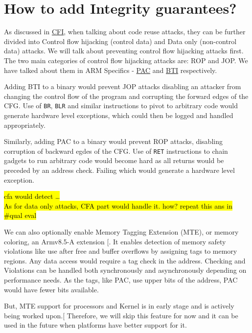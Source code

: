 \documentclass[a4paper, nobind]{templates/ociamthesis}
\begin{document}
\section{How to add Integrity guarantees?}\label{how-to-add-integrity-guarantees}

As discussed in \hyperref[cfi]{CFI}, when talking about code reuse attacks, they can be further divided into
Control flow hijacking (control data) and Data only (non-control data) attacks.
We will talk about preventing control flow hijacking attacks first.
The two main categories of control flow hijacking attacks are: ROP and JOP.
We have talked about them in ARM Specifics - \hyperref[pac-bg]{PAC} and \hyperref[bti-bg]{BTI} respectively.

Adding BTI to a binary would prevent JOP attacks disabling an attacker from changing
the control flow of the program and corrupting the forward edges of the CFG.
Use of \texttt{BR}, \texttt{BLR} and similar instructions to pivot to arbitrary code would generate hardware
level exceptions, which could then be logged and handled appropriately.

Similarly, adding PAC to a binary would prevent ROP attacks, disabling corruption
of backward egdes of the CFG.
Use of \texttt{RET} instructions to chain gadgets to run arbitrary code would become hard
as all returns would be preceded by an address check. Failing which would generate
a hardware level exception.

\hl{cfa would detect \ldots{}\\
As for data only attacks, CFA part would handle it. how? repeat this ans in \#qual eval}

We can also optionally enable Memory Tagging Extension (MTE), or memory coloring,
an Armv8.5-A extension {[}\citeproc{ref-arm-pacbti}{5}{]}. It enables detection of memory safety violations like use after free
and buffer overflows by assigning tags to memory regions. Any data access would
require a tag check in the address. Checking and Violations can be handled both
synchronously and asynchronously depending on performance needs.
As the tags, like PAC, use upper bits of the address, PAC would have fewer bits available.

But, MTE support for processors and Kernel is in early stage and is actively being worked upon.{[}\citeproc{ref-mte-kern-patch}{26}{]}
Therefore, we will skip this feature for now and it can be used in the future when platforms
have better support for it.
\end{document}
